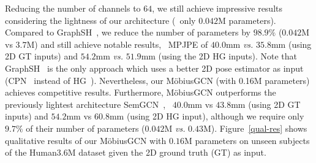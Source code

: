 \documentclass[runningheads]{llncs}
\begin{document}
Reducing the number of channels to $64$, we still achieve impressive results considering the lightness of our architecture (\ie~only $0.042\text{M}$ parameters).
Compared to GraphSH~\cite{xu2021graph}, we reduce the number of parameters by $98.9\%$ ($0.042\text{M}$ vs $3.7\text{M}$) and still achieve notable results, \ie~MPJPE of $40.0\text{mm}$ \emph{vs.} $35.8\text{mm}$ (using 2D GT inputs) and $54.2\text{mm}$ \emph{vs.} $51.9\text{mm}$ (using the 2D HG inputs).
Note that GraphSH~\cite{xu2021graph} is the only approach which uses a better 2D pose estimator as input (CPN~\cite{Chen_2018_CVPR} instead of HG~\cite{newell2016stacked}). Nevertheless, our M\"obiusGCN (with 0.16M parameters) achieves competitive results.
Furthermore, M\"obiusGCN outperforms the previously lightest architecture SemGCN~\cite{zhaoCVPR19semantic}, \ie~$40.0\text{mm}$ vs $43.8\text{mm}$ (using 2D GT inputs) and $54.2\text{mm}$ vs $60.8\text{mm}$ (using 2D HG input), although we require only $9.7\%$ of their number of parameters ($0.042\text{M}$ \emph{vs.} $0.43\text{M}$).
Figure~\ref{qual-res} shows qualitative results of our M\"obiusGCN with $0.16\text{M}$ parameters on unseen subjects of the Human3.6M dataset given the 2D ground truth (GT) as input.
\vspace{-25px}
\begin{center}
 
\label{mpi-inf-3dhp}
 \end{center}
\end{document}
